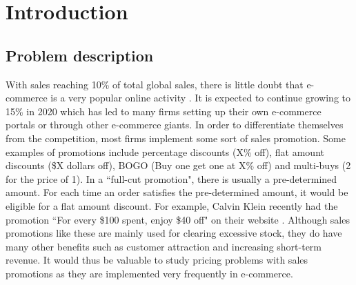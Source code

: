 \documentclass[a4paper]{article}
\begin{document}
\pagebreak
\section{Introduction}
\subsection{Problem description}
With sales reaching 10\% of total global sales, there is little doubt that e-commerce is a very popular online activity \cite{nano3}. It is expected to continue growing to 15\% in 2020 which has led to many firms setting up their own e-commerce portals or through other e-commerce giants. In order to differentiate themselves from the competition, most firms implement some sort of sales promotion. Some examples of promotions include percentage discounts (X\% off), flat amount discounts (\$X dollars off), BOGO (Buy one get one at X\% off) and multi-buys (2 for the price of 1).  In a ``full-cut promotion", there is usually a pre-determined amount. For each time an order satisfies the pre-determined amount, it would be eligible for a flat amount discount. For example, Calvin Klein recently had the promotion ``For every \$100 spent, enjoy \$40 off" on their website \cite{CK}. Although sales promotions like these are mainly used for clearing excessive stock, they do have many other benefits such as customer attraction and increasing short-term revenue. It would thus be valuable to study pricing problems with sales promotions as they are implemented very frequently in e-commerce. 
\end{document}
